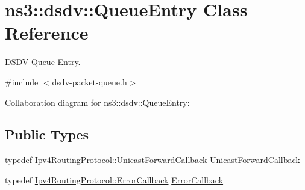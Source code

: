 \hypertarget{classns3_1_1dsdv_1_1QueueEntry}{}\section{ns3\+:\+:dsdv\+:\+:Queue\+Entry Class Reference}
\label{classns3_1_1dsdv_1_1QueueEntry}


D\+S\+DV \hyperlink{classns3_1_1Queue}{Queue} Entry.  




{\ttfamily \#include $<$dsdv-\/packet-\/queue.\+h$>$}



Collaboration diagram for ns3\+:\+:dsdv\+:\+:Queue\+Entry\+:
\subsection*{Public Types}
\begin{DoxyCompactItemize}
\item 
typedef \hyperlink{classns3_1_1Ipv4RoutingProtocol_a3453a85764cbbb1e704da7e919aa5d19}{Ipv4\+Routing\+Protocol\+::\+Unicast\+Forward\+Callback} \hyperlink{classns3_1_1dsdv_1_1QueueEntry_a5c41d545aa1e05b73ee36b718f331522}{Unicast\+Forward\+Callback}
\item 
typedef \hyperlink{classns3_1_1Ipv4RoutingProtocol_a0348285418c30d5021b08f7a68af21ea}{Ipv4\+Routing\+Protocol\+::\+Error\+Callback} \hyperlink{classns3_1_1dsdv_1_1QueueEntry_ad6d86a09705f644d2535f606e70c1c29}{Error\+Callback}
\end{DoxyCompactItemize}
